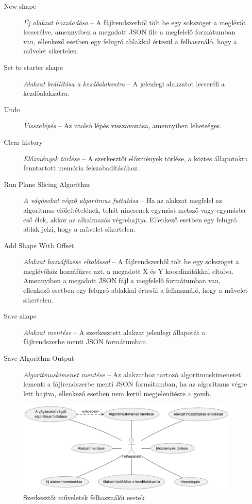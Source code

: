 \begin{description}
    \item[New shape] \textit{Új alakzat hozzáadása} -- A fájlrendszerből tölt be egy sokszöget a meglévőt lecserélve, amennyiben a megadott JSON file a megfelelő formátumban van, ellenkező esetben egy felugró ablakkal értesül a felhasználó, hogy a művelet sikertelen.
    \item[Set to starter shape] \textit{Alakzat beállítása a kezdőalakzatra} -- A jelenlegi alakzatot lecseréli a kezdőalakzatra.
    \item[Undo] \textit{Visszalépés} -- Az utolsó lépés visszavonása, amennyiben lehetséges.
    \item[Clear history] \textit{Előzmények törlése} -- A szerkesztői előzmények törlése, a köztes állapotokra fenntartott memória felszabadításához.
    \item[Run Plane Slicing Algorithm] \textit{A vágásokat végző algoritmus futtatása} -- Ha az alakzat megfelel az algoritmus előfeltételének, tehát nincsenek egymást metsző vagy egymásba eső élek, akkor az alkalmazás végrehajtja. Ellenkező esetben egy felugró ablak jelzi, hogy a művelet sikertelen.
    \item[Add Shape With Offset] \textit{Alakzat hozzáfűzése eltolással} -- A fájlrendszerből tölt be egy sokszöget a meglévőhöz hozzáfűzve azt, a megadott X és Y koordinátákkal eltolva. Amennyiben a megadott JSON fájl a megfelelő formátumban van, ellenkező esetben egy felugró ablakkal értesül a felhasználó, hogy a művelet sikertelen.
    \item[Save shape] \textit{Alakzat mentése} -- A szerkesztett alakzat jelenlegi állapotát a fájlrendszerbe menti JSON formátumban.
    \item[Save Algorithm Output] \textit{Algoritmuskimenet mentése} -- Az alakzathoz tartozó algoritmuskimenetet lementi a fájlrendszerbe menti JSON formátumban, ha az algoritmus végre lett hajtva, ellenkező esetben nem kerül megjelenítésre a gomb.
\end{description}

\begin{figure}[H]
    \centering
    \includegraphics[width=1\linewidth]{images/usecase_editor_actions.png}
    \caption{Szerkesztői műveletek felhasználói esetek}
    \label{fig:usecase_editor_actions-1}
\end{figure}

